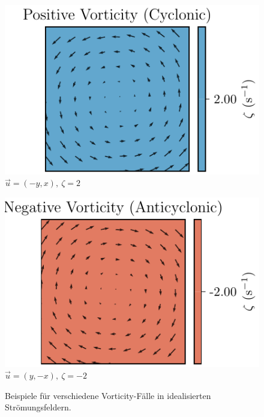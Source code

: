 \begin{figure}[h]
    \begin{minipage}{0.32\linewidth}
        \centering
        \includegraphics[width=\linewidth]{papers/rossby/images/vorticity_plot3.pdf}\\
        {\small \( \vec{u} = (-y,x),\ \zeta = 2\)}
    \end{minipage}
    \begin{minipage}{0.32\linewidth}
        \centering
        \includegraphics[width=\linewidth]{papers/rossby/images/vorticity_plot4.pdf}\\
        {\small \( \vec{u} = (y,-x),\ \zeta = -2\)}
    \end{minipage}

    \caption{Beispiele für verschiedene Vorticity-Fälle in idealisierten Strömungsfeldern.}
    \label{fig:vorticity_examples}
\end{figure}


